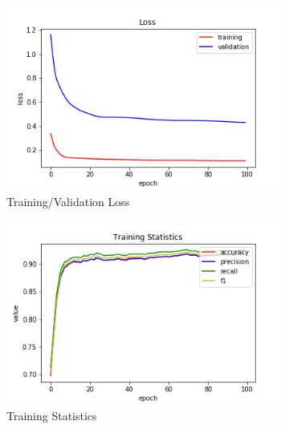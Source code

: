 \begin{figure}[h!]
  \centerfloat
  \begin{subfigure}[b]{0.35\linewidth}
    \includegraphics[width=\linewidth]{images/trained_online_lstm/tile_by_tile_training_house_10000_model_loss.png}
     \caption{Training/Validation Loss}
  \end{subfigure}
  \hfill
  \begin{subfigure}[b]{0.35\linewidth}
    \includegraphics[width=\linewidth]{images/trained_online_lstm/tile_by_tile_training_house_10000_model_training_stats.png}
     \caption{Training Statistics}
  \end{subfigure}
  \hfill
  \begin{subfigure}[b]{0.35\linewidth}

\end{subfigure}
\end{figure}
